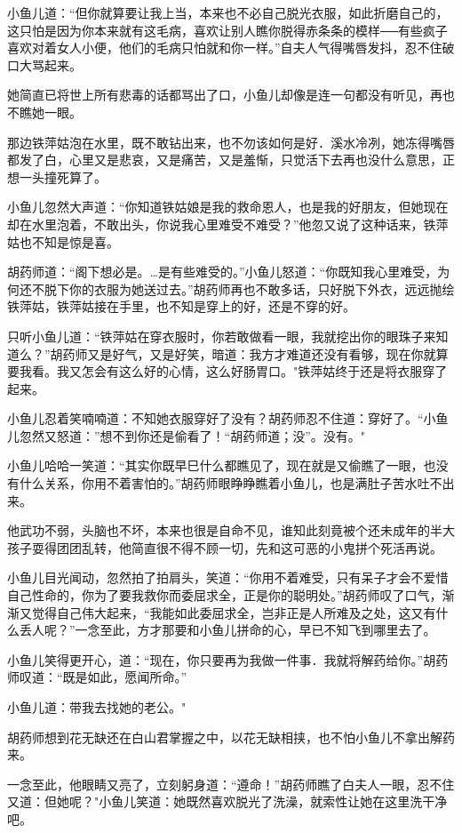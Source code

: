 \documentclass[12pt,oneside]{book}
\begin{document}
小鱼儿道：``但你就算要让我上当，本来也不必自己脱光衣服，如此折磨自己的，这只怕是因为你本来就有这毛病，喜欢让别人瞧你脱得赤条条的模样──有些疯子喜欢对着女人小便，他们的毛病只怕就和你一样。''自夫人气得嘴唇发抖，忍不住破口大骂起来。

她简直已将世上所有悲毒的话都骂出了口，小鱼儿却像是连一句都没有听见，再也不瞧她一眼。

那边铁萍姑泡在水里，既不敢钻出来，也不勿该如何是好．溪水冷冽，她冻得嘴唇都发了白，心里又是悲哀，又是痛苦，又是羞惭，只觉活下去再也没什么意思，正想一头撞死算了。

小鱼儿忽然大声道：``你知道铁姑娘是我的救命恩人，也是我的好朋友，但她现在却在水里泡着，不敢出头，你说我心里难受不难受？''他忽又说了这种话来，铁萍姑也不知是惊是喜。

胡药师道：``阁下想必是。\ldots 是有些难受的。''小鱼儿怒道：``你既知我心里难受，为何还不脱下你的衣服为她送过去。''胡药师再也不敢多话，只好脱下外衣，远远抛绘铁萍姑，铁萍姑接在手里，也不知是穿上的好，还是不穿的好。

只听小鱼儿道：``铁萍姑在穿衣服时，你若敢做看一眼，我就挖出你的眼珠子来知道么？''胡药师又是好气，又是好笑，暗道：我方才难道还没有看够，现在你就算要我看。我又怎会有这么好的心情，这么好肠胃口。"铁萍姑终于还是将衣服穿了起来。

小鱼儿忍着笑喃喃道：不知她衣服穿好了没有？胡药师忍不住道：穿好了。``小鱼儿忽然又怒道：''想不到你还是偷看了！``胡药师道；没''。没有。"

小鱼儿哈哈一笑道：``其实你既早巳什么都瞧见了，现在就是又偷瞧了一眼，也没有什么关系，你用不着害怕的。''胡药师眼睁睁瞧着小鱼儿，也是满肚子苦水吐不出来。

他武功不弱，头脑也不坏，本来也很是自命不见，谁知此刻竟被个还未成年的半大孩子耍得团团乱转，他简直很不得不顾一切，先和这可恶的小鬼拼个死活再说。

小鱼儿目光闻动，忽然拍了拍肩头，笑道：``你用不着难受，只有呆子才会不爱惜自己性命的，你为了要我救你而委屈求全，正是你的聪明处。''胡药师叹了口气，渐渐又觉得自己伟大起来，``我能如此委屈求全，岂非正是人所难及之处，这又有什么丢人呢？''一念至此，方才那要和小鱼儿拼命的心，早已不知飞到哪里去了。

小鱼儿笑得更开心，道：``现在，你只要再为我做一件事．我就将解药给你。''胡药师叹道：``既是如此，愿闻所命。''

小鱼儿道：带我去找她的老公。"

胡药师想到花无缺还在白山君掌握之中，以花无缺相挟，也不怕小鱼儿不拿出解药来。

一念至此，他眼睛又亮了，立刻躬身道：``遵命！''胡药师瞧了白夫人一眼，忍不住又道：但她呢？"小鱼儿笑道：她既然喜欢脱光了洗澡，就索性让她在这里洗干净吧。
\end{document}
